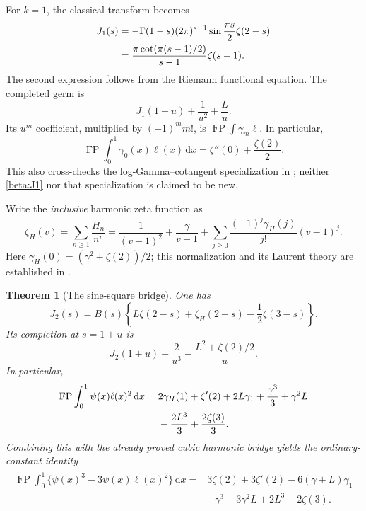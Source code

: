 \documentclass[11pt]{article}
\numberwithin{equation}{section}
\newtheorem{theorem}{Theorem}[section]
\theoremstyle{definition}
\theoremstyle{remark}
\DeclareMathOperator{\FP}{FP}
\newcommand{\dd}{\,\mathrm d}
\begin{document}
For $k=1$, the classical transform becomes
\begin{align}\label{beta:J1}
 J_1(s)&=-\Gamma(1-s)(2\pi)^{s-1}
                \sin\frac{\pi s}{2}\zeta(2-s)\notag\\
 &=\frac{\pi\cot(\pi(s-1)/2)}{s-1}\zeta(s-1).
\end{align}
The second expression follows from the Riemann functional equation.
The completed germ is
\begin{equation}\label{beta:J1completion}
 J_1(1+u)+\frac1{u^2}+\frac L u.
\end{equation}
Its $u^m$ coefficient, multiplied by $(-1)^m m!$, is
$\FP\int\gamma_m\ell$. In particular,
\begin{equation}\label{beta:firstmoment}
 \FP\int_0^1\gamma_0(x)\ell(x)\dd x
 =\zeta''(0)+\frac{\zeta(2)}2.
\end{equation}
This also cross-checks the log-Gamma--cotangent specialization in
\cite{RepoExact}; neither \eqref{beta:J1} nor that specialization is
claimed to be new.

Write the \emph{inclusive} harmonic zeta function as
\begin{equation}\label{beta:Hzeta}
 \zeta_H(v)=\sum_{n\geq1}\frac{H_n}{n^v}
 =\frac1{(v-1)^2}+\frac\gamma{v-1}
  +\sum_{j\geq0}\frac{(-1)^j\gamma_H(j)}{j!}(v-1)^j.
\end{equation}
Here $\gamma_H(0)=(\gamma^2+\zeta(2))/2$; this normalization and
its Laurent theory are established in \cite{Kargin,Can}.

\begin{theorem}[The sine-square bridge]\label{beta:secondmoment}
One has
\begin{equation}\label{beta:J2}
 J_2(s)=B(s)\left\{L\zeta(2-s)+\zeta_H(2-s)
                       -\frac12\zeta(3-s)\right\}.
\end{equation}
Its completion at $s=1+u$ is
\begin{equation}\label{beta:J2completion}
 J_2(1+u)+\frac2{u^3}-\frac{L^2+\zeta(2)/2}{u}.
\end{equation}
In particular,
\begin{align}\label{beta:P2}
 \FP\int_0^1\psi(x)\ell(x)^2\dd x
 ={}&2\gamma_H(1)+\zeta'(2)+2L\gamma_1
    +\frac{\gamma^3}3+\gamma^2L\notag\\
   &-\frac{2L^3}3+\frac{2\zeta(3)}3.
\end{align}
Combining this with the already proved cubic harmonic bridge yields
the ordinary-constant identity
\begin{align}\label{beta:cancellation}
 \boxed{\begin{aligned}
 \FP\int_0^1\bigl\{\psi(x)^3-3\psi(x)\ell(x)^2\bigr\}\dd x
 ={}&3\zeta(2)+3\zeta'(2)-6(\gamma+L)\gamma_1\\
   &-\gamma^3-3\gamma^2L+2L^3-2\zeta(3).
 \end{aligned}}
\end{align}
\end{theorem}
\end{document}
